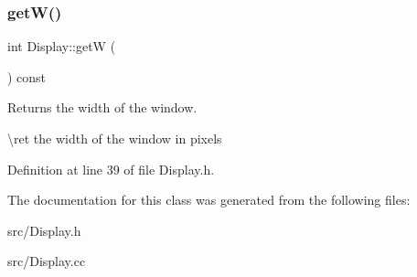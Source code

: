 \subsubsection{\texorpdfstring{getW()}{getW()}}
{\footnotesize\ttfamily int Display\+::getW (\begin{DoxyParamCaption}{ }\end{DoxyParamCaption}) const\hspace{0.3cm}{\ttfamily [inline]}}



Returns the width of the window. 

\textbackslash{}ret the width of the window in pixels 

Definition at line 39 of file Display.\+h.


\begin{DoxyCode}{0}

\end{DoxyCode}


The documentation for this class was generated from the following files\+:\begin{DoxyCompactItemize}
\item 
src/Display.\+h\item 
src/Display.\+cc\end{DoxyCompactItemize}

